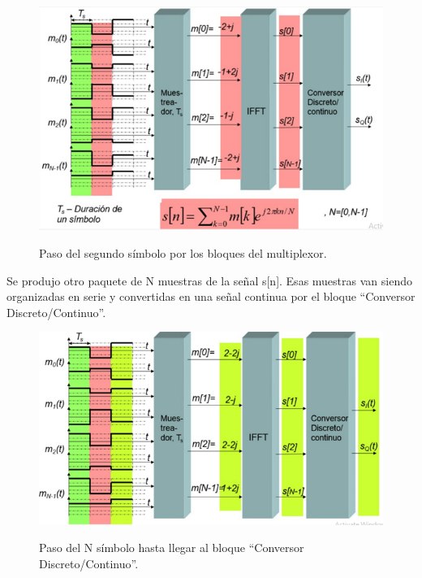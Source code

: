 \begin{figure}[h!]
	\captionsetup{justification = raggedright, singlelinecheck = false}
	\caption{Paso del segundo símbolo por los bloques del multiplexor.} 
	\centering
	\includegraphics[scale=0.9]{Imagenes/Conversor-continuo.png}
	\label{fig:Conversor-continuo}
\end{figure}

Se produjo otro paquete de N muestras de la señal s[n]. Esas muestras van siendo organizadas en serie y convertidas en una señal continua por el bloque “Conversor Discreto/Continuo”.

\vspace{200px}
\begin{figure}[h!]
	\captionsetup{justification = raggedright, singlelinecheck = false}
	\caption{Paso del N símbolo hasta llegar al bloque “Conversor Discreto/Continuo”. } 
	\centering
	\includegraphics[scale=0.9]{Imagenes/Muestreador.png}
	\label{fig:Muestreador}
\end{figure}

